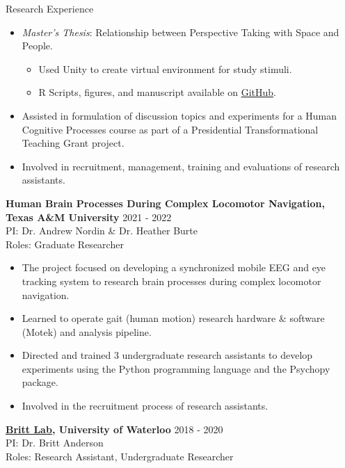 \documentclass{resume} %
\begin{document}
\begin{rSection}{Research Experience}
\begin{itemize}[nosep]
        \item \emph{Master's Thesis}: Relationship between Perspective Taking 
        with Space and People.
            \begin{itemize}
                \item Used Unity to create virtual environment for study stimuli.
                \item R Scripts, figures, and manuscript available on \href{https://github.com/sjp117/spatialSocialPerspectiveTaking}{GitHub}.
            \end{itemize}
        \item Assisted in formulation of discussion topics and experiments for 
        a Human Cognitive Processes course as part of a Presidential 
        Transformational Teaching Grant project.
        \item Involved in recruitment, management, training and evaluations of research assistants.
        
    \end{itemize}

    {\bf {Human Brain Processes During Complex Locomotor Navigation},
        Texas A\&M University}
    \hfill {2021 - 2022}
    \\PI: Dr. Andrew Nordin \& Dr. Heather Burte
    \\Roles: Graduate Researcher
    
    \begin{itemize}[nosep]
        
        \item The project focused on developing a synchronized mobile EEG and eye tracking system to research brain processes during complex locomotor navigation.
        \item Learned to operate gait (human motion) research hardware \& software (Motek) and analysis pipeline.
        \item Directed and trained 3 undergraduate research assistants to 
        develop experiments using the Python programming language and the Psychopy package.
        \item Involved in the recruitment process of research assistants.
        
    \end{itemize}
    
    {\bf \href{https://brittlab.uwaterloo.ca/}{Britt Lab}, 
        University of Waterloo}
    \hfill {2018 - 2020}
    \\PI: Dr. Britt Anderson
    \\Roles: Research Assistant, Undergraduate Researcher
    

\end{rSection}
\end{document}
